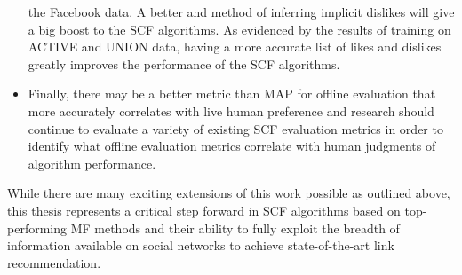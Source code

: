 \begin{itemize}
the Facebook data.  A better and method of inferring implicit dislikes
will give a big boost to the SCF algorithms. As evidenced by the
results of training on ACTIVE and UNION data, having a more accurate
list of likes and dislikes greatly improves the performance of the SCF
algorithms.
\item Finally, there may be a better metric than MAP for offline
evaluation that more accurately correlates with live human
preference and research should continue to evaluate a variety
of existing SCF evaluation metrics in order to identify what
offline evaluation metrics correlate with human judgments of
algorithm performance.
\end{itemize}

While there are many exciting extensions of this work possible
as outlined above, 
this thesis represents a critical step forward in SCF
algorithms based on top-performing MF methods and their ability to
fully exploit the breadth of information available on social networks
to achieve state-of-the-art link recommendation.

